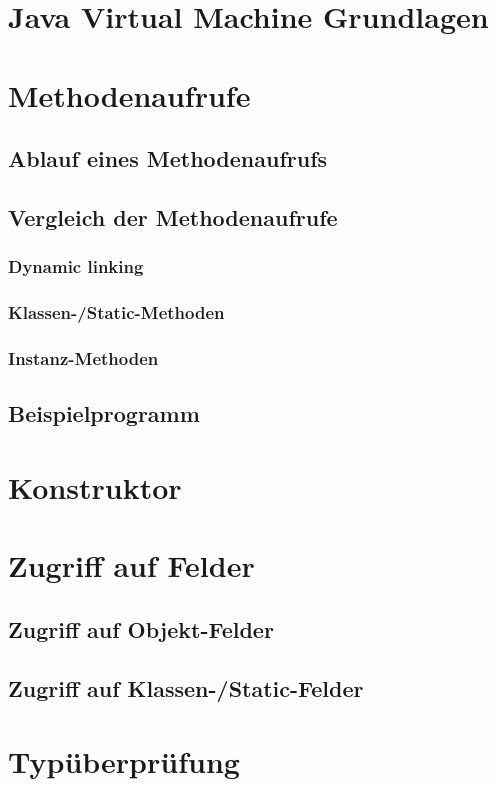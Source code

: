 \documentclass[conference]{IEEEtran}
\begin{document}
\section{Java Virtual Machine Grundlagen}

\section{Methodenaufrufe}
\subsection{Ablauf eines Methodenaufrufs}

\subsection{Vergleich der Methodenaufrufe}
\subsubsection{Dynamic linking}
\subsubsection{Klassen-/Static-Methoden}
\subsubsection{Instanz-Methoden}

\subsection{Beispielprogramm}

\section{Konstruktor}

\section{Zugriff auf Felder}
\subsection{Zugriff auf Objekt-Felder}
\subsection{Zugriff auf Klassen-/Static-Felder}

\section{Typüberprüfung}

 
\end{document}
